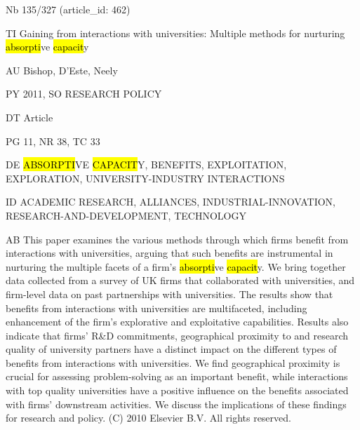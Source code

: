 \documentclass[a4paper]{article}
\begin{document}
\vspace*{-2cm}
Nb \tabto{0cm}135/327 (article\_id: 462)\par
TI \tabto{0cm}Gaining from interactions with universities: Multiple methods for nurturing \hl{absorpti}ve \hl{capacit}y\par
AU \tabto{0cm}Bishop, D'Este, Neely\par
PY \tabto{0cm}2011, SO RESEARCH POLICY\par
DT \tabto{0cm}Article\par
PG \tabto{0cm}11, NR 38, TC 33\par
DE \tabto{0cm}\hl{ABSORPTI}VE \hl{CAPACIT}Y, BENEFITS, EXPLOITATION, EXPLORATION, UNIVERSITY-INDUSTRY INTERACTIONS\par
ID \tabto{0cm}ACADEMIC RESEARCH, ALLIANCES, INDUSTRIAL-INNOVATION, RESEARCH-AND-DEVELOPMENT, TECHNOLOGY\par
AB \tabto{0cm}This paper examines the various methods through which firms benefit from interactions with universities, arguing that such benefits are instrumental in nurturing the multiple facets of a firm's \hl{absorpti}ve \hl{capacit}y. We bring together data collected from a survey of UK firms that collaborated with universities, and firm-level data on past partnerships with universities. The results show that benefits from interactions with universities are multifaceted, including enhancement of the firm's explorative and exploitative capabilities. Results also indicate that firms' R\&D commitments, geographical proximity to and research quality of university partners have a distinct impact on the different types of benefits from interactions with universities. We find geographical proximity is crucial for assessing problem-solving as an important benefit, while interactions with top quality universities have a positive influence on the benefits associated with firms' downstream activities. We discuss the implications of these findings for research and policy. (C) 2010 Elsevier B.V. All rights reserved.\par
\clearpage
\end{document}
